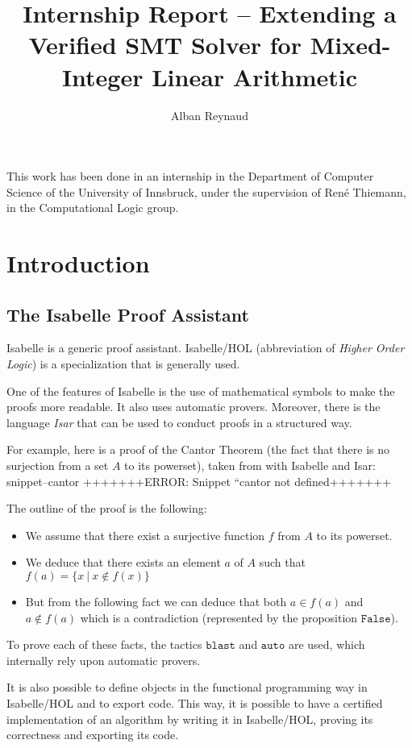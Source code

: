 \documentclass{article}
\title{Internship Report -- Extending a Verified SMT Solver for Mixed-Integer
Linear Arithmetic}
\author{Alban Reynaud}
\date{}
\newcommand{\Snippet}[1]{%
  \ifcsname snippet--#1\endcsname{\csname snippet--#1\endcsname}%
  \else+++++++ERROR: Snippet ``#1 not defined+++++++ \fi}
\begin{document}
\maketitle

This work has been done in an internship in the Department of Computer Science
of the University of Innsbruck, under the supervision of René Thiemann, in the
Computational Logic group.

\tableofcontents

\begin{abstract}
\end{abstract}

\section{Introduction}
\subsection{The Isabelle Proof Assistant}
Isabelle \cite{Isabelle} is a generic proof assistant. Isabelle/HOL
(abbreviation of \textit{Higher Order Logic}) is a specialization that is
generally used.

One of the features of Isabelle is the use of mathematical symbols to make the
proofs more readable. It also uses automatic provers.
Moreover, there is the language \textit{Isar} that can be used to conduct proofs
in a structured way.

For example, here is a proof of the Cantor Theorem (the fact that there is no
surjection from a set $A$ to its powerset), taken from
\cite[Section 5.1]{ConcreteSemantics}
with Isabelle and Isar:
\Snippet{cantor}

The outline of the proof is the following:
\begin{itemize}
  \item We assume that there exist a surjective function $f$ from $A$ to
    its powerset.
  \item We deduce that there exists an element $a$ of $A$ such that
    $f(a) = \{x~|~x \notin f(x)\}$
  \item But from the following fact we can deduce that both $a \in f(a)$ and $a
    \notin f(a)$ which is a contradiction (represented by the proposition
    $\mathtt{False}$).
\end{itemize}
To prove each of these facts, the tactics $\mathtt{blast}$ and
$\mathtt{auto}$ are used, which internally rely upon automatic provers.

It is also possible to define objects in the functional programming way in
Isabelle/HOL and to export code. This way, it is possible to have a certified
implementation of an algorithm by writing it in Isabelle/HOL, proving its
correctness and exporting its code.
\end{document}
